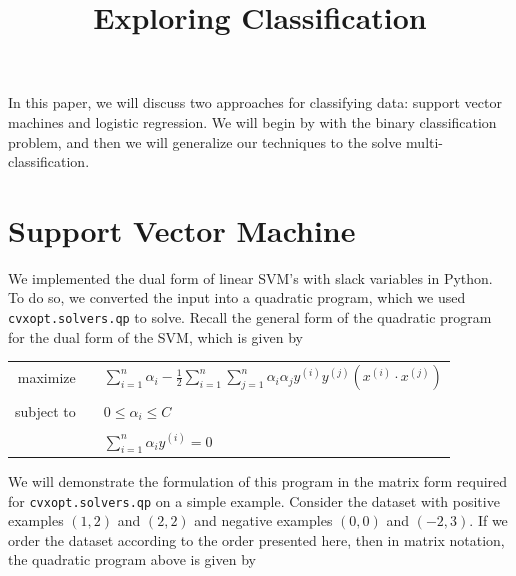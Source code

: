 \documentclass{sigchi}
\begin{document}
\title{Exploring Classification}


\maketitle

\large

In this paper, we will discuss two approaches for classifying data: support vector machines and logistic regression. We will begin by with the binary classification problem, and then we will generalize our techniques to the solve multi-classification.


\section{Support Vector Machine}


We implemented the dual form of linear SVM's with slack variables in Python. To do so, we converted the input into a quadratic program, which we used \texttt{cvxopt.solvers.qp} to solve. Recall the general form of the quadratic program for the dual form of the SVM, which is given by

\normalsize
\begin{center}\begin{tabular}{r p{0.0in} l }
maximize && $ \displaystyle \sum_{i =1}^n \alpha_i - \frac{1}{2}\sum_{i = 1}^{n}\sum_{j = 1}^n \alpha_i\alpha_jy^{(i)}y^{(j)}(x^{(i)}\cdot x^{(j)}) $
\\ && \\
subject to && $ \displaystyle 0 \leq \alpha_i \leq C$ 
\\ && \\
&&		      $ \displaystyle \sum_{i = 1}^{n} \alpha_iy^{(i)} = 0$
\end{tabular}\end{center}

\large

We will demonstrate the formulation of this program in the matrix form required for \texttt{cvxopt.solvers.qp} on a simple example. Consider the dataset with positive examples $(1, 2)$ and $(2, 2)$ and negative examples $(0, 0)$ and $(-2, 3)$.
If we order the dataset according to the order presented here, then in matrix notation, the quadratic program above is given by
\end{document}
